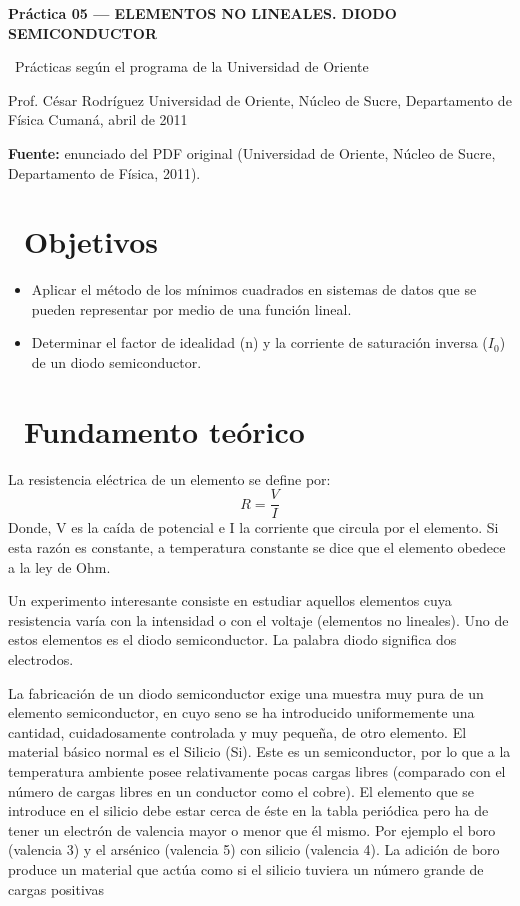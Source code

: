 \documentclass[11pt,a4paper]{article}
\newcommand{\iconoBanda}{microchip}
\newcommand{\bandaTitulo}[3][fondoOscuro]{%
  \begin{tcolorbox}[
    enhanced,
    colback=#1, colframe=#1,
    boxrule=0pt, arc=8pt, outer arc=8pt,
    width=\linewidth,
    top=18pt, bottom=6pt, left=14pt, right=14pt,
    borderline south={3.5pt}{0pt}{cyanNeon},
  ]
    \begin{minipage}[c]{0.07\linewidth}
      \centering
      \textcolor{cyanNeon}{\fontsize{30}{30}\selectfont\faIcon{\iconoBanda}}
    \end{minipage}%
    \hspace{8pt}%
    \begin{minipage}[c]{0.88\linewidth}
      {\fontsize{20}{24}\selectfont\bfseries\color{white}#2}\par\vspace{5pt}%
      \textcolor{cyanNeon!80!white}{\small\faIcon{angle-right}~#3}%
    \end{minipage}
    \vspace{4pt}
  \end{tcolorbox}%
  \vspace{8pt}%
}
\newcommand{\iconotexto}[2]{\textcolor{cyanNeon}{\faIcon{#1}}~#2}
\renewcommand{\iconoBanda}{flask}
\begin{document}
\bandaTitulo[fondoOscuro]{Práctica 05 --- ELEMENTOS NO LINEALES. DIODO SEMICONDUCTOR}{Prácticas según el programa de la Universidad de Oriente}

\begin{center}\small\color{grisTexto}Prof. César Rodríguez \textbar{} Universidad de Oriente, Núcleo de Sucre, Departamento de Física \textbar{} Cumaná, abril de 2011\end{center}

\begin{tcolorbox}[cajaContenido]\textbf{Fuente:} enunciado del PDF original (Universidad de Oriente, Núcleo de Sucre, Departamento de Física, 2011).
\end{tcolorbox}

\section{\iconotexto{bullseye}{Objetivos}}

\begin{itemize}[leftmargin=1.4em,itemsep=2pt,topsep=3pt]
  \item Aplicar el método de los mínimos cuadrados en sistemas de datos que se pueden representar por medio de una función lineal.
  \item Determinar el factor de idealidad (n) y la corriente de saturación inversa ($I_0$) de un diodo semiconductor.
\end{itemize}

\section{\iconotexto{book-open}{Fundamento teórico}}

La resistencia eléctrica de un elemento se define por: \[R = \frac{V}{I}\] Donde, V es la caída de potencial e I la corriente que circula por el elemento. Si esta razón es constante, a temperatura constante se dice que el elemento obedece a la ley de Ohm.

Un experimento interesante consiste en estudiar aquellos elementos cuya resistencia varía con la intensidad o con el voltaje (elementos no lineales). Uno de estos elementos es el diodo semiconductor. La palabra diodo significa dos electrodos.

La fabricación de un diodo semiconductor exige una muestra muy pura de un elemento semiconductor, en cuyo seno se ha introducido uniformemente una cantidad, cuidadosamente controlada y muy pequeña, de otro elemento. El material básico normal es el Silicio (Si). Este es un semiconductor, por lo que a la temperatura ambiente posee relativamente pocas cargas libres (comparado con el número de cargas libres en un conductor como el cobre). El elemento que se introduce en el silicio debe estar cerca de éste en la tabla periódica pero ha de tener un electrón de valencia mayor o menor que él mismo. Por ejemplo el boro (valencia 3) y el arsénico (valencia 5) con silicio (valencia 4). La adición de boro produce un material que actúa como si el silicio tuviera un número grande de cargas positivas
\end{document}
